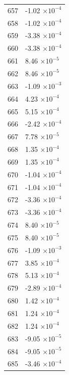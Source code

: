 \documentclass[a4paper,11pt]{article}
\begin{document}
\begin{center}
\begin{longtable}{|R{1.5cm}|R{2.5cm}|}
  657 &        -1.02 $\times 10^{          -4}$ \\
  658 &        -1.02 $\times 10^{          -4}$ \\
  659 &        -3.38 $\times 10^{          -4}$ \\
  660 &        -3.38 $\times 10^{          -4}$ \\
  661 &         8.46 $\times 10^{          -5}$ \\
  662 &         8.46 $\times 10^{          -5}$ \\
  663 &        -1.09 $\times 10^{          -3}$ \\
  664 &         4.23 $\times 10^{          -4}$ \\
  665 &         5.15 $\times 10^{          -4}$ \\
  666 &        -2.42 $\times 10^{          -4}$ \\
  667 &         7.78 $\times 10^{          -5}$ \\
  668 &         1.35 $\times 10^{          -4}$ \\
  669 &         1.35 $\times 10^{          -4}$ \\
  670 &        -1.04 $\times 10^{          -4}$ \\
  671 &        -1.04 $\times 10^{          -4}$ \\
  672 &        -3.36 $\times 10^{          -4}$ \\
  673 &        -3.36 $\times 10^{          -4}$ \\
  674 &         8.40 $\times 10^{          -5}$ \\
  675 &         8.40 $\times 10^{          -5}$ \\
  676 &        -1.09 $\times 10^{          -3}$ \\
  677 &         3.85 $\times 10^{          -4}$ \\
  678 &         5.13 $\times 10^{          -4}$ \\
  679 &        -2.89 $\times 10^{          -4}$ \\
  680 &         1.42 $\times 10^{          -4}$ \\
  681 &         1.24 $\times 10^{          -4}$ \\
  682 &         1.24 $\times 10^{          -4}$ \\
  683 &        -9.05 $\times 10^{          -5}$ \\
  684 &        -9.05 $\times 10^{          -5}$ \\
  685 &        -3.46 $\times 10^{          -4}$ \\

\end{longtable}
\end{center}
\end{document}
